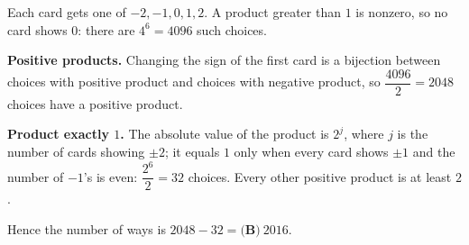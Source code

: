 Each card gets one of $-2,-1,0,1,2$. A product greater than $1$ is nonzero, so no card shows $0$: there are $4^6=4096$ such choices.

\textbf{Positive products.} Changing the sign of the first card is a bijection between choices with positive product and choices with negative product, so $\dfrac{4096}{2}=2048$ choices have a positive product.

\textbf{Product exactly $1$.} The absolute value of the product is $2^j$, where $j$ is the number of cards showing $\pm2$; it equals $1$ only when every card shows $\pm1$ and the number of $-1$'s is even: $\dfrac{2^6}{2}=32$ choices. Every other positive product is at least $2$.

Hence the number of ways is $2048-32=\boxed{\textbf{(B)}\ 2016}$.
